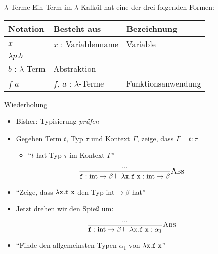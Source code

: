 \documentclass{beamer}
\begin{document}
\newcommand{\typeRule}[3]{\frac{#2}{#3} \textrm{\textsc{#1}}}

\begin{frame}{$\lambda$-Terme}
	Ein Term im $\lambda$-Kalkül hat eine der drei folgenden Formen:

	\vspace{0.5cm}

	\begin{tabularx}{\textwidth}{ X | X | X }
		\textbf{Notation} & \textbf{Besteht aus}                      & \textbf{Bezeichnung} \\
		\hline
		$x$               & $x$ : Variablenname                       & Variable             \\
		\hline
		$\lambda{}p.b$    &
			\begin{tabular}[t]{@{}c@{}}$p$ : Variablenname\\$b$ : $\lambda$-Term\end{tabular}
									      & Abstraktion          \\
		\hline
		$f$ $a$           & $f$, $a$ : $\lambda$-Terme                & Funktionsanwendung   \\
	\end{tabularx}
\end{frame}

\begin{frame}{Wiederholung}
	\begin{itemize}
		\item Bisher: Typisierung \emph{prüfen}
		\item Gegeben Term $t$, Typ $\tau$ und Kontext $\Gamma$, zeige, dass $\Gamma \vdash t : \tau$
		\begin{itemize}
			\item \enquote{$t$ hat Typ $\tau$ im Kontext $\Gamma$}
		\end{itemize}
	\end{itemize}

	\begin{equation*}
		\typeRule{Abs}{
			...
		}{
			\texttt{f} : \textrm{int} \to \beta \vdash \abs{\texttt{x}}{\liin{\texttt{f}}{\texttt{x}}} : \textrm{int} \to \beta
		}
	\end{equation*}
	
	\begin{itemize}
		\item \enquote{Zeige, dass $\lambda{}\texttt{x}.\texttt{f}\;{}\texttt{x}$ den Typ $\textrm{int} \to \beta$ hat}
		\pause
		\item Jetzt drehen wir den Spieß um:
	\end{itemize}

	\begin{equation*}
		\typeRule{Abs}{
			...
		}{
			\texttt{f} : \textrm{int} \to \beta \vdash \abs{\texttt{x}}{\liin{\texttt{f}}{\texttt{x}}} : \alpha_1
		}
	\end{equation*}

	\begin{itemize}
		\item \enquote{Finde den allgemeinsten Typen $\alpha_1$ von $\lambda{}\texttt{x}.\texttt{f}\;{}\texttt{x}$}
	\end{itemize}
\end{frame}
\end{document}
